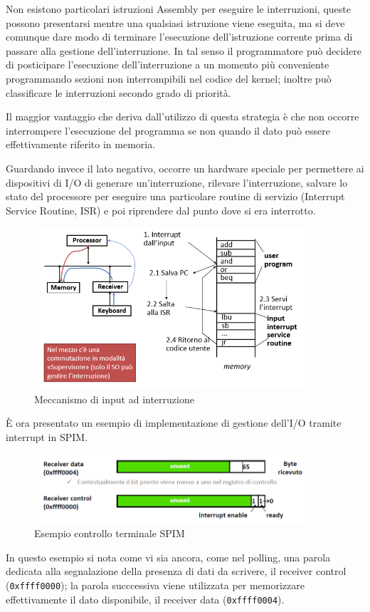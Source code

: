 \documentclass[class=book, crop=false, oneside]{standalone}
\begin{document}
Non esistono particolari istruzioni Assembly per eseguire le interruzioni, queste possono presentarsi mentre una qualsiasi istruzione viene eseguita, ma si deve comunque dare modo di terminare l'esecuzione dell'istruzione corrente prima di passare alla gestione dell'interruzione. In tal senso il programmatore può decidere di posticipare l'esecuzione dell'interruzione a un momento più conveniente programmando sezioni non interrompibili nel codice del kernel; inoltre può classificare le interruzioni secondo grado di priorità.

Il maggior vantaggio che deriva dall'utilizzo di questa strategia è che non occorre interrompere l'esecuzione del programma se non quando il dato può essere effettivamente riferito in memoria.

Guardando invece il lato negativo, occorre un hardware speciale per permettere ai dispositivi di I/O di generare un'interruzione, rilevare l'interruzione, salvare lo stato del processore per eseguire una particolare routine di servizio (Interrupt Service Routine, ISR) e poi riprendere dal punto dove si era interrotto.

\begin{figure}[!h]
	\centering
	\includegraphics[width=0.9\textwidth,keepaspectratio]{input-a-interruzione}
	\caption{Meccanismo di input ad interruzione}
\end{figure}
È ora presentato un esempio di implementazione di gestione dell'I/O tramite interrupt in SPIM.
\begin{figure}[!h]
	\centering
	\includegraphics[width=0.9\textwidth,keepaspectratio]{SPIM2}
	\caption{Esempio controllo terminale SPIM}
\end{figure}
In questo esempio si nota come vi sia ancora, come nel polling, una parola dedicata alla segnalazione della presenza di dati da scrivere, il receiver control (\texttt{0xffff0000}); la parola succcessiva viene utilizzata per memorizzare effettivamente il dato disponibile, il receiver data (\texttt{0xffff0004}).
\end{document}
